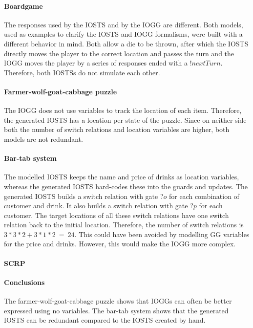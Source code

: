 \paragraph*{Boardgame}
The responses used by the IOSTS and by the IOGG are different. Both models, used as examples to clarify the IOSTS and IOGG formalisms, were built with a different behavior in mind. Both allow a die to be thrown, after which the IOSTS directly moves the player to the correct location and passes the turn and the IOGG moves the player by a series of responses ended with a $!nextTurn$. Therefore, both IOSTSs do not simulate each other.

\paragraph*{Farmer-wolf-goat-cabbage puzzle}
The IOGG does not use variables to track the location of each item. Therefore, the generated IOSTS has a location per state of the puzzle. Since on neither side both the number of switch relations and location variables are higher, both models are not redundant.

\paragraph*{Bar-tab system}
The modelled IOSTS keeps the name and price of drinks as location variables, whereas the generated IOSTS hard-codes these into the guards and updates. The generated IOSTS builds a switch relation with gate $?o$ for each combination of customer and drink. It also builds a switch relation with gate $?p$ for each customer. The target locations of all these switch relations have one switch relation back to the initial location. Therefore, the number of switch relations is $3*3*2+3*1*2\: =\: 24$. This could have been avoided by modelling GG variables for the price and drinks. However, this would make the IOGG more complex. 

\paragraph*{SCRP}

\paragraph*{Conclusions}
The farmer-wolf-goat-cabbage puzzle shows that IOGGs can often be better expressed using no variables. The bar-tab system shows that the generated IOSTS can be redundant compared to the IOSTS created by hand.

